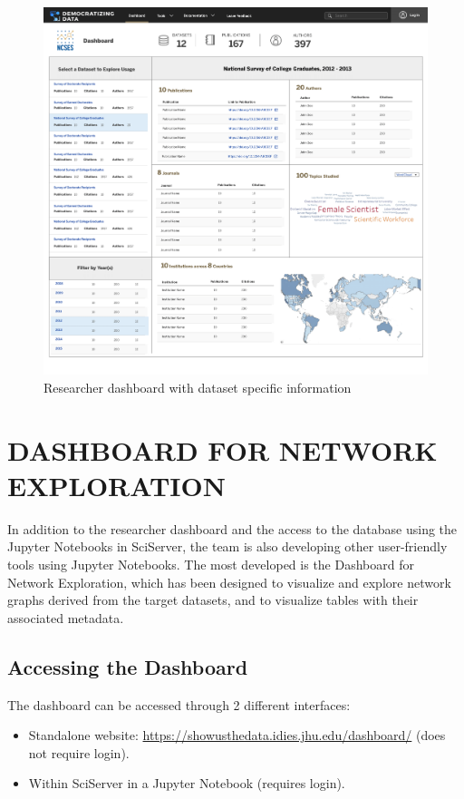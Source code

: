 \documentclass[titlepage, 11pt]{article}
\begin{document}
{%
\begin{figure}
\centering
  \includegraphics[scale=0.30]{Researcher.png}
  \caption{Researcher dashboard with dataset specific information}
  \label{fig:Researcher}
\end{figure}

\section{DASHBOARD FOR NETWORK EXPLORATION}
\label{sec:Chapter10}
In addition to the researcher dashboard and the access to the database using the Jupyter Notebooks in SciServer, the team is also developing other user-friendly tools using Jupyter Notebooks. The most developed is the Dashboard for Network Exploration, which has been designed to visualize and explore network graphs derived from the target  datasets, and to visualize tables with their associated metadata. 

\subsection{Accessing the Dashboard}
The dashboard can be accessed through 2 different interfaces:
\begin{itemize}
    \item Standalone website: \url{https://showusthedata.idies.jhu.edu/dashboard/} (does not require login).
    \item Within SciServer in a Jupyter Notebook (requires login).
\end{itemize}


}
\end{document}
